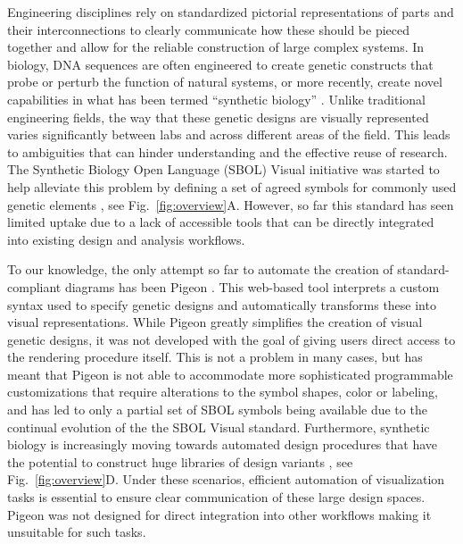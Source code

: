 \documentclass{bioinfo}
\begin{document}
Engineering disciplines rely on standardized pictorial representations of parts and their interconnections to clearly communicate how these should be pieced together and allow for the reliable construction of large complex systems. In biology, DNA sequences are often engineered to create genetic constructs that probe or perturb the function of natural systems, or more recently, create novel capabilities in what has been termed ``synthetic biology'' \citep{Church14a}. Unlike traditional engineering fields, the way that these genetic designs are visually represented varies significantly between labs and across different areas of the field. This leads to ambiguities that can hinder understanding and the effective reuse of research. The Synthetic Biology Open Language (SBOL) Visual initiative was started to help alleviate this problem by defining a set of agreed symbols for commonly used genetic elements \citep{Quinn13a}, see Fig.~\ref{fig:overview}A. However, so far this standard has seen limited uptake due to a lack of accessible tools that can be directly integrated into existing design and analysis workflows.

To our knowledge, the only attempt so far to automate the creation of standard-compliant diagrams has been Pigeon \citep{Bhatia13a}. This web-based tool interprets a custom syntax used to specify genetic designs and automatically transforms these into visual representations. While Pigeon greatly simplifies the creation of visual genetic designs, it was not developed with the goal of giving users direct access to the rendering procedure itself. This is not a problem in many cases, but has meant that Pigeon is not able to accommodate more sophisticated programmable customizations that require alterations to the symbol shapes, color or labeling, and has led to only a partial set of SBOL symbols being available due to the continual evolution of the the SBOL Visual standard. Furthermore, synthetic biology is increasingly moving towards automated design procedures that have the potential to construct huge libraries of design variants \citep{Smanski14a,Bilitchenko11a}, see Fig.~\ref{fig:overview}D. Under these scenarios, efficient automation of visualization tasks is essential to ensure clear communication of these large design spaces. Pigeon was not designed for direct integration into other workflows making it unsuitable for such tasks.
\end{document}
